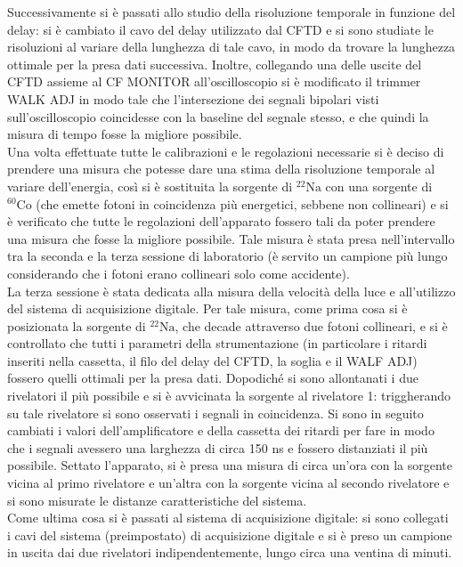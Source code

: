 Successivamente si è passati allo studio della risoluzione temporale in funzione del delay: si è cambiato il cavo del delay utilizzato dal CFTD e si sono studiate le
risoluzioni al variare della lunghezza di tale cavo, in modo da trovare la lunghezza ottimale per la presa dati successiva. Inoltre, collegando una delle uscite del
CFTD assieme al CF MONITOR all'oscilloscopio si è modificato il trimmer WALK ADJ in modo tale che l'intersezione dei segnali bipolari visti sull'oscilloscopio
coincidesse con la baseline del segnale stesso, e che quindi la misura di tempo fosse la migliore possibile.\\

Una volta effettuate tutte le calibrazioni e le regolazioni necessarie si è deciso di prendere una misura che potesse dare una stima della risoluzione temporale al
variare dell'energia, così si è sostituita la sorgente di $^{22}\text{Na}$ con una sorgente di $^{60}\text{Co}$ (che emette fotoni in coincidenza più energetici, sebbene non collineari)
e si è verificato che tutte le regolazioni dell'apparato fossero tali da poter prendere una misura che fosse la migliore possibile. Tale misura è stata presa
nell'intervallo tra la seconda e la terza sessione di laboratorio (è servito un campione più  lungo considerando che i fotoni erano collineari solo come accidente).\\

La terza sessione è stata dedicata alla misura della velocità della luce e all'utilizzo del sistema di acquisizione digitale. Per tale misura,
come prima cosa si è posizionata la sorgente di $^{22}\text{Na}$, che decade attraverso due fotoni collineari, e si è controllato che tutti i parametri della strumentazione
(in particolare i ritardi inseriti nella cassetta, il filo del delay del CFTD, la soglia e il WALF ADJ) fossero quelli ottimali per la presa dati. Dopodiché si sono allontanati
i due rivelatori il più possibile e
si è avvicinata la sorgente al rivelatore 1: triggherando su tale rivelatore si sono osservati i segnali in coincidenza. Si sono in seguito cambiati i valori dell'amplificatore
e della cassetta dei ritardi per fare in modo che i segnali avessero una larghezza di circa 150 ns e fossero distanziati il più possibile. Settato l'apparato, si è presa una
misura di circa un'ora con la sorgente vicina al primo rivelatore e un'altra con la sorgente vicina al secondo rivelatore e si sono misurate le distanze caratteristiche del 
sistema.\\

Come ultima cosa si è passati al sistema di acquisizione digitale: si sono collegati i cavi del sistema (preimpostato) di acquisizione digitale
e si è preso un campione in uscita dai due rivelatori indipendentemente, lungo circa una ventina di minuti.
